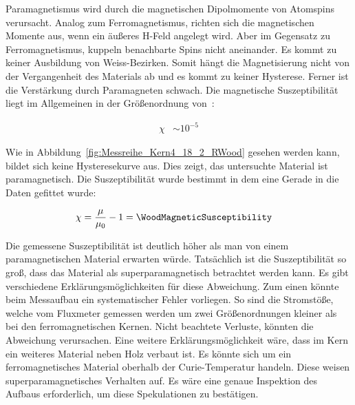 \documentclass[a4paper,10pt,twocolumn]{article}
\begin{document}
    Paramagnetismus wird durch die magnetischen Dipolmomente von Atomspins verursacht.
    Analog zum Ferromagnetismus, richten sich die magnetischen Momente aus, wenn ein äußeres H-Feld angelegt wird.
    Aber im Gegensatz zu Ferromagnetismus, kuppeln benachbarte Spins nicht aneinander.
    Es kommt zu keiner Ausbildung von Weiss-Bezirken.
    Somit hängt die Magnetisierung nicht von der Vergangenheit des Materials ab und es kommt zu keiner Hysterese.
    Ferner ist die Verstärkung durch Paramagneten schwach.
    Die magnetische Suszeptibilität liegt im Allgemeinen in der Größenordnung von~\cite{gerth}:
    
    \begin{align*}
        \chi  &\sim 10^{-5}
    \end{align*}
    
    
    Wie in Abbildung~\ref{fig:Messreihe_Kern4_18_2_RWood} gesehen werden kann, bildet sich keine Hysteresekurve aus.
    Dies zeigt, das untersuchte Material ist paramagnetisch.
    Die Suszeptibilität wurde bestimmt in dem eine Gerade in die Daten gefittet wurde:
    
    \begin{align*}
        \chi &= \frac{\mu}{\mu_0} - 1 = \WoodMagneticSusceptibility
    \end{align*}
    
    
    Die gemessene Suszeptibilität ist deutlich höher als man von einem paramagnetischen Material erwarten würde.
    Tatsächlich ist die Suszeptibilität so groß, dass das Material als superparamagnetisch betrachtet werden kann.
    Es gibt verschiedene Erklärungsmöglichkeiten für diese Abweichung.
    Zum einen könnte beim Messaufbau ein systematischer Fehler vorliegen.
    So sind die Stromstöße, welche vom Fluxmeter gemessen werden um zwei Größenordnungen kleiner als bei den
    ferromagnetischen Kernen.
    Nicht beachtete Verluste, könnten die Abweichung verursachen.
    Eine weitere Erklärungsmöglichkeit wäre, dass im Kern ein weiteres Material neben Holz verbaut ist.
    Es könnte sich um ein ferromagnetisches Material oberhalb der Curie-Temperatur handeln.
    Diese weisen superparamagnetisches Verhalten auf.
    Es wäre eine genaue Inspektion des Aufbaus erforderlich, um diese Spekulationen zu bestätigen.
    
\end{document}
